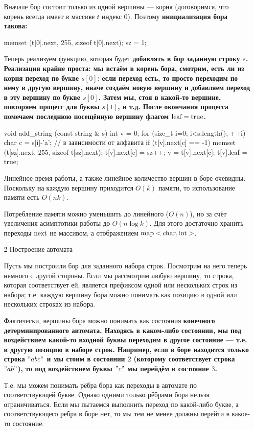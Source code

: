 Вначале бор состоит только из одной вершины --- корня (договоримся, что корень всегда имеет в массиве $t$ индекс $0$). Поэтому \bf{инициализация} бора такова:

\code
memset (t[0].next, 255, sizeof t[0].next);
sz = 1;
\endcode

Теперь реализуем функцию, которая будет \bf{добавлять в бор} заданную строку $s$. Реализация крайне проста: мы встаём в корень бора, смотрим, есть ли из корня переход по букве $s[0]$: если переход есть, то просто переходим по нему в другую вершину, иначе создаём новую вершину и добавляем переход в эту вершину по букве $s[0]$. Затем мы, стоя в какой-то вершине, повторяем процесс для буквы $s[1]$, и т.д. После окончания процесса помечаем последнюю посещённую вершину флагом $\rm leaf = true$.

\code
void add_string (const string & s) {
	int v = 0;
	for (size_t i=0; i<s.length(); ++i) {
		char c = s[i]-'a'; // в зависимости от алфавита
		if (t[v].next[c] == -1) {
			memset (t[sz].next, 255, sizeof t[sz].next);
			t[v].next[c] = sz++;
		}
		v = t[v].next[c];
	}
	t[v].leaf = true;
}
\endcode

Линейное время работы, а также линейное количество вершин в боре очевидны. Поскольку на каждую вершину приходится $O (k)$ памяти, то использование памяти есть $O (n k)$.

Потребление памяти можно уменьшить до линейного ($O (n)$), но за счёт увеличения асимптотики работы до $O (n \log k)$. Для этого достаточно хранить переходы $\rm next$ не массивом, а отображением $\rm map<char,int>$.


\h2{ Построение автомата }

Пусть мы построили бор для заданного набора строк. Посмотрим на него теперь немного с другой стороны. Если мы рассмотрим любую вершину, то строка, которая соответствует ей, является префиксом одной или нескольких строк из набора; т.е. каждую вершину бора можно понимать как позицию в одной или нескольких строках из набора.

Фактически, вершины бора можно понимать как состояния \bf{конечного детерминированного автомата}. Находясь в каком-либо состоянии, мы под воздействием какой-то входной буквы переходим в другое состояние --- т.е. в другую позицию в наборе строк. Например, если в боре находится только строка $"abc"$ и мы стоим в состоянии $2$ (которому соответствует строка $"ab"$), то под воздействием буквы $"c"$ мы перейдём в состояние $3$.

Т.е. мы можем понимать рёбра бора как переходы в автомате по соответствующей букве. Однако одними только рёбрами бора нельзя ограничиваться. Если мы пытаемся выполнить переход по какой-либо букве, а соответствующего ребра в боре нет, то мы тем не менее должны перейти в какое-то состояние.

